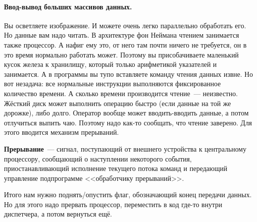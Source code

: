 \documentclass{article}
\begin{document}
    \paragraph{Ввод-вывод больших массивов данных.}
    Вы осветляете изображение. И можете очень легко параллельно обработать его. Но данные вам надо читать. В архитектуре фон Неймана чтением занимается также процессор. А нафиг ему это, от него там почти ничего не требуется, он в это время нормально работать может. Поэтому вы присобачиваете маленький кусок железа к хранилищу, который только арифметикой указателей и занимается. А в программы вы тупо вставляете команду чтения данных извне. Но вот незадача: все нормальные инструкции выполняются фиксированное количество времени. А сколько времени производится чтение~--- неизвестно. Жёсткий диск может выполнить операцию быстро (если данные на той же дорожке), либо долго. Оператор вообще может вводить-вводить данные, а потом отлучиться выпить чаю. Поэтому надо как-то сообщать, что чтение заверено. Для этого вводится механизм прерываний.
    \begin{definition}
        \textbf{Прерывание}~--- сигнал, поступающий от внешнего устройства к центральному процессору, сообщающий о наступлении некоторого события, приостанавливающий исполнение текущего потока команд и передающий управление подпрограмме <<обработчику прерываний>>.
    \end{definition}
    Итого нам нужно поднять/опустить флаг, обозначающий конец передачи данных. Но для этого надо прервать процессор, переместить в код где-то внутри диспетчера, а потом вернуться ещё.
\end{document}
